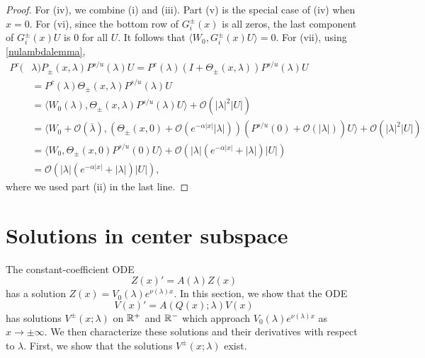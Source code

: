 \documentclass[thesis.tex]{subfiles}
\begin{document}
\begin{lemma}
\begin{proof}
For (iv), we combine (i) and (iii). Part (v) is the special case of (iv) when $x = 0$. For (vi), since the bottom row of $G_i^\pm(x)$ is all zeros, the last component of $G_i^\pm(x) U$ is 0 for all $U$. It follows that $\langle W_0, G_i^\pm(x) U\rangle = 0$. For (vii), using \cref{nulambdalemma},
\begin{align*}
P^c(&\lambda) P_\pm(x, \lambda) P^{s/u}(\lambda) U 
= P^c(\lambda)(I + \Theta_\pm(x, \lambda) ) P^{s/u}(\lambda) U \\
&= P^c(\lambda) \Theta_\pm(x, \lambda) P^{s/u}(\lambda) U \\
&= \langle W_0(\lambda), \Theta_\pm(x, \lambda) P^{s/u}(\lambda) U \rangle + \mathcal{O}(|\lambda|^2 |U| ) \\
&= \langle W_0 + \mathcal{O}(\overline{\lambda}), (\Theta_\pm(x, 0) + \mathcal{O}(e^{-\alpha |x|}|\lambda|)) (P^{s/u}(0) + \mathcal{O}(|\lambda|)) U \rangle + \mathcal{O}(|\lambda|^2 |U| ) \\
&= \langle W_0, \Theta_\pm(x, 0) P^{s/u}(0) U \rangle + \mathcal{O}(|\lambda|(e^{-\alpha |x|} + |\lambda|) |U| ) \\
&= \mathcal{O}(|\lambda|(e^{-\alpha |x|} + |\lambda|) |U| ),
\end{align*}
where we used part (ii) in the last line.
\end{proof}
\end{lemma}

\section{Solutions in center subspace}

The constant-coefficient ODE
\[
Z(x)' = A(\lambda)Z(x)
\]
has a solution $Z(x) = V_0(\lambda)e^{\nu(\lambda)x}$. In this section, we show that the ODE
\[
V(x)' = A(Q(x); \lambda)V(x)
\]
has solutions $V^\pm(x; \lambda)$ on $\mathbb{R}^+$ and $\mathbb{R}^-$ which approach $V_0(\lambda)e^{\nu(\lambda)x}$ as $x \rightarrow \pm \infty$. We then characterize these solutions and their derivatives with respect to $\lambda$. First, we show that the solutions $V^\pm(x; \lambda)$ exist.
\end{document}
